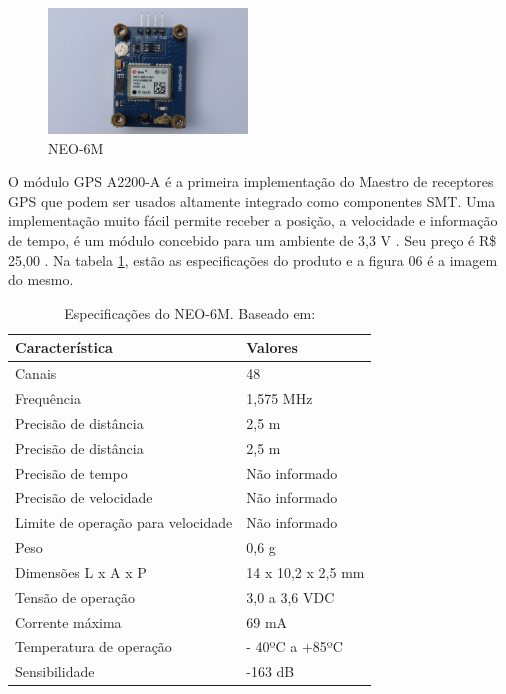 \begin{enumerate}
\begin{enumerate}
 \begin{figure}[h]
   \centering
   \includegraphics[width=200px, scale=1]{figuras/gps_neo}
   \caption{NEO-6M  \cite{14gps}}
 \label{fig:gps_neo}
 \end{figure}

 O módulo GPS A2200-A é a primeira implementação do Maestro de receptores
 GPS que podem ser usados altamente integrado como componentes SMT. Uma
 implementação muito fácil permite
 receber a posição, a velocidade e informação de tempo, é um módulo concebido
 para um ambiente de 3,3 V \cite{15gps}. Seu preço é R\$ 25,00 \cite{16gps}. Na tabela \ref{table:especificacao_gps_neo6m},
 estão as especificações do produto e a figura 06 é a imagem do mesmo.

 \begin{table}[ht]
 \caption{Especificações do NEO-6M. Baseado em: \cite{15gps}}
 \centering
 \begin{tabular}{| l |  p{5cm} |}
 \hline
 Característica & Valores \\
 \hline
 Canais & 48 \\
 \hline
 Frequência & 1,575 MHz \\
 \hline
 Precisão de distância & 2,5 m \\
 \hline
 Precisão de distância & 2,5 m \\
 \hline
 Precisão de tempo & Não informado \\
 \hline
 Precisão de velocidade & Não informado \\
 \hline
 Limite de operação para velocidade & Não informado \\
 \hline
 Peso & 0,6 g \\
 \hline
 Dimensões L x A x P & 14 x 10,2 x 2,5 mm \\
 \hline
 Tensão de operação & 3,0 a 3,6 VDC \\
 \hline
 Corrente máxima & 69 mA \\
 \hline
 Temperatura de operação & - 40ºC a +85ºC \\
 \hline
 Sensibilidade & -163 dB \\
 \hline
 \end{tabular}
 \label{table:especificacao_gps_neo6m}
 \end{table}


\end{enumerate}
\end{enumerate}
